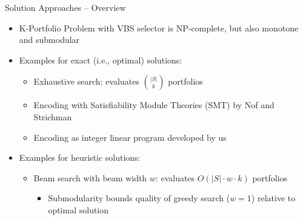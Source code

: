 \documentclass[en]{sdqbeamer}
\begin{document}
\begin{frame}[t]{Solution Approaches -- Overview}
	\begin{itemize}
		\item K-Portfolio Problem with VBS selector is NP-complete, but also monotone and submodular~\cite{nof2020real}
		\pause
		\vspace{\baselineskip}
		\item Examples for exact (i.e., optimal) solutions:
		\begin{itemize}
			\item Exhaustive search: evaluates $\binom{|S|}{k}$ portfolios
			\pause
			\item Encoding with Satisfiability Module Theories (SMT) by Nof and Strichman~\cite{nof2020real}
			\pause
			\item Encoding as integer linear program developed by us
		\end{itemize}
		\pause
		\vspace{\baselineskip}
		\item Examples for heuristic solutions:
		\begin{itemize}
			\item Beam search with beam width $w$: evaluates $O(|S| \cdot w \cdot k)$ portfolios
			\begin{itemize}
				\item Submodularity bounds quality of greedy search ($w=1$) relative to optimal solution~\cite{nemhauser1978analysis, nof2020real}

\end{itemize}
\end{itemize}
\end{itemize}
\end{frame}
\end{document}

